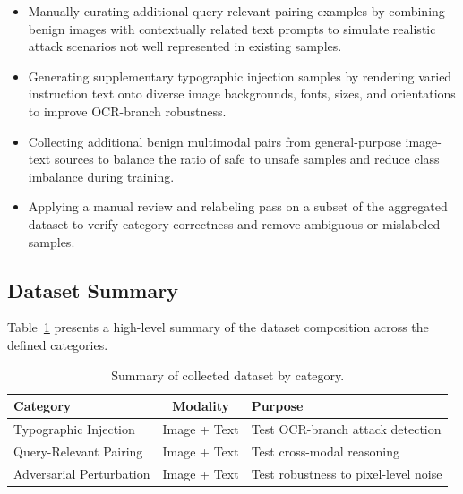 \begin{itemize}

    \item Manually curating additional query-relevant pairing examples by
    combining benign images with contextually related text prompts to
    simulate realistic attack scenarios not well represented in existing
    samples.

    \item Generating supplementary typographic injection samples by rendering
    varied instruction text onto diverse image backgrounds, fonts, sizes,
    and orientations to improve OCR-branch robustness.

    \item Collecting additional benign multimodal pairs from general-purpose
    image-text sources to balance the ratio of safe to unsafe samples and
    reduce class imbalance during training.

    \item Applying a manual review and relabeling pass on a subset of the
    aggregated dataset to verify category correctness and remove ambiguous
    or mislabeled samples.

\end{itemize}


\subsection{Dataset Summary}

Table~\ref{tab:dataset-summary} presents a high-level summary of the dataset
composition across the defined categories.

\begin{table}[H]
    \centering
    \caption{Summary of collected dataset by category.}
    \label{tab:dataset-summary}

    \begin{tabular}{|l|c|l|}
        \hline
        \textbf{Category} & \textbf{Modality} & \textbf{Purpose} \\
        \hline
        Typographic Injection
        & Image + Text
        & Test OCR-branch attack detection \\
        \hline

        Query-Relevant Pairing
        & Image + Text
        & Test cross-modal reasoning \\
        \hline

        Adversarial Perturbation
        & Image + Text
        & Test robustness to pixel-level noise \\
        \hline

    \end{tabular}
\end{table}

